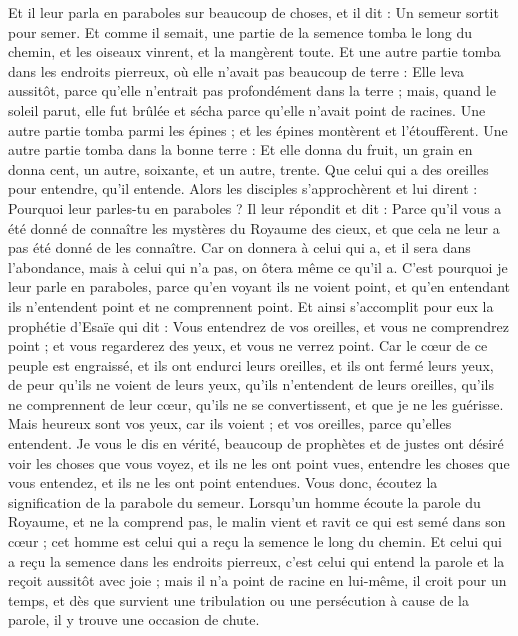 \begin{multicols}{2}
Et il leur parla en paraboles sur beaucoup de choses, et il dit : Un semeur sortit pour semer.
Et comme il semait, une partie de la semence tomba le long du chemin, et les oiseaux vinrent, et la mangèrent toute.
Et une autre partie tomba dans les endroits pierreux, où elle n'avait pas beaucoup de terre : Elle leva aussitôt, parce qu'elle n'entrait pas profondément dans la terre ;
mais, quand le soleil parut, elle fut brûlée et sécha parce qu'elle n'avait point de racines.
Une autre partie tomba parmi les épines ; et les épines montèrent et l'étouffèrent.
Une autre partie tomba dans la bonne terre : Et elle donna du fruit, un grain en donna cent, un autre, soixante, et un autre, trente.
Que celui qui a des oreilles pour entendre, qu'il entende.
Alors les disciples s'approchèrent et lui dirent : Pourquoi leur parles-tu en paraboles ?
Il leur répondit et dit : Parce qu'il vous a été donné de connaître les mystères du Royaume des cieux, et que cela ne leur a pas été donné de les connaître.
Car on donnera à celui qui a, et il sera dans l’abondance, mais à celui qui n'a pas, on ôtera même ce qu’il a.
C'est pourquoi je leur parle en paraboles, parce qu'en voyant ils ne voient point, et qu'en entendant ils n'entendent point et ne comprennent point.
Et ainsi s'accomplit pour eux la prophétie d'Esaïe qui dit : Vous entendrez de vos oreilles, et vous ne comprendrez point ; et vous regarderez des yeux, et vous ne verrez point.
Car le cœur de ce peuple est engraissé, et ils ont endurci leurs oreilles, et ils ont fermé leurs yeux, de peur qu'ils ne voient de leurs yeux, qu'ils n'entendent de leurs oreilles, qu'ils ne comprennent de leur cœur, qu’ils ne se convertissent, et que je ne les guérisse.
Mais heureux sont vos yeux, car ils voient ; et vos oreilles, parce qu’elles entendent.
Je vous le dis en vérité, beaucoup de prophètes et de justes ont désiré voir les choses que vous voyez, et ils ne les ont point vues, entendre les choses que vous entendez, et ils ne les ont point entendues.
Vous donc, écoutez la signification de la parabole du semeur.
Lorsqu’un homme écoute la parole du Royaume, et ne la comprend pas, le malin vient et ravit ce qui est semé dans son cœur ; cet homme est celui qui a reçu la semence le long du chemin.
Et celui qui a reçu la semence dans les endroits pierreux, c'est celui qui entend la parole et la reçoit aussitôt avec joie ;
mais il n'a point de racine en lui-même, il croit pour un temps, et dès que survient une tribulation ou une persécution à cause de la parole, il y trouve une occasion de chute.

\end{multicols}
